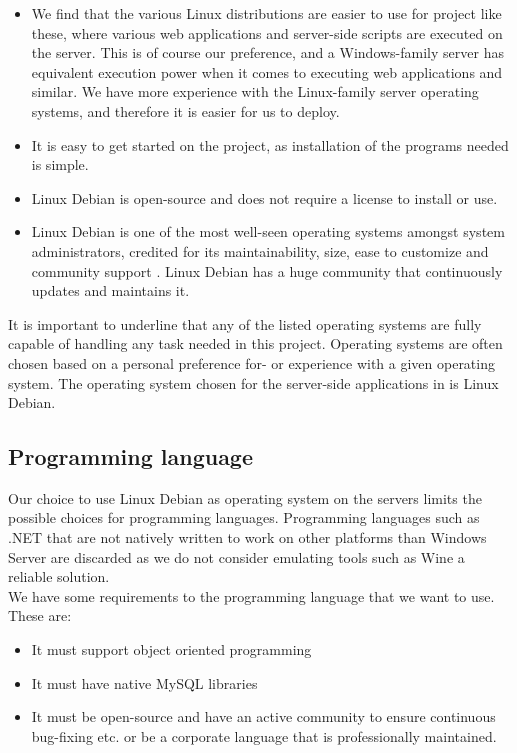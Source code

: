 \begin{itemize}
    \item We find that the various Linux distributions are easier to use for project like these, where various web applications and server-side scripts are executed on the server. This is of course our preference, and a Windows-family server has equivalent execution power when it comes to executing web applications and similar. We have more experience with the Linux-family server operating systems, and therefore it is easier for us to deploy.
    \item It is easy to get started on the project, as installation of the programs needed is simple.
    \item Linux Debian is open-source and does not require a license to install or use.
    \item Linux Debian is one of the most well-seen operating systems amongst system administrators, credited for its maintainability, size, ease to customize and community support \citep{why_debian}. Linux Debian has a huge community that continuously updates and maintains it.
\end{itemize}

It is important to underline that any of the listed operating systems are fully capable of handling any task needed in this project.
Operating systems are often chosen based on a personal preference for- or experience with a given operating system.
The operating system chosen for the server-side applications in \projectname{} is Linux Debian.

\subsection{Programming language}
Our choice to use Linux Debian as operating system on the servers limits the possible choices for programming languages.
Programming languages such as .NET that are not natively written to work on other platforms than Windows Server are discarded as we do not consider emulating tools such as Wine a reliable solution. \\

We have some requirements to the programming language that we want to use.
These are:

\begin{itemize}
    \item It must support object oriented programming
    \item It must have native MySQL libraries
    \item It must be open-source and have an active community to ensure continuous bug-fixing etc. or be a corporate language that is professionally maintained.
\end{itemize}

